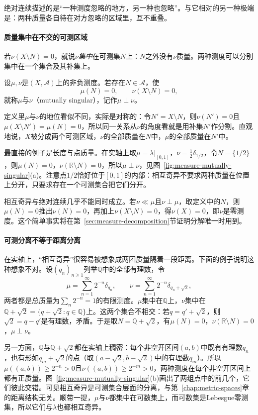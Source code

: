 绝对连续描述的是“一种测度忽略的地方，另一种也忽略”。与它相对的另一种极端是：两种质量各自待在对方忽略的区域里，互不重叠。

\paragraph{质量集中在不交的可测区域}
若$\nu(X\setminus N)=0$，就说$\nu$\emph{集中}在可测集$N$上：$N$之外没有$\nu$质量。两种测度可以分别集中在一个集合及其补集上。

\begin{definition}[相互奇异]
\label{def:measure-singular}
设$\mu,\nu$是$(X,\mathcal A)$上的非负测度。若存在$N\in\mathcal A$，使
\[
 \mu(N)=0,\qquad \nu(X\setminus N)=0,
\]
就称$\mu$与$\nu$（mutually singular），记作$\mu\perp\nu$。
\end{definition}

定义里$\mu$与$\nu$的地位看似不同，实际是对称的：令$N'=X\setminus N$，则$\nu(N')=0$且$\mu(X\setminus N')=\mu(N)=0$，所以同一关系从$\nu$的角度看就是用补集$N'$作分割。直观地说，$X$被分成两个可测区域，$\nu$的全部质量在$N$中，$\mu$的全部质量在$N'$中。

最直接的例子是长度与点质量。在实轴上取$\mu=\lambda|_{[0,1]}$，$\nu=\tfrac12\delta_{1/2}$，令$N=\{1/2\}$，则$\mu(N)=0$，$\nu(\mathbb R\setminus N)=0$，所以$\mu\perp\nu$，见图~\ref{fig:measure-mutually-singular}(a)。注意点$1/2$恰好位于$[0,1]$的内部：相互奇异不要求两种质量在位置上分开，只要求存在一个可测集合把它们分开。

相互奇异与绝对连续几乎不能同时成立。若$\nu\ll\mu$且$\nu\perp\mu$，取定义中的$N$，则$\mu(N)=0$推出$\nu(N)=0$，再加上$\nu(X\setminus N)=0$，得$\nu(X)=0$，即$\nu$是零测度。这个简单事实将在第~\ref{sec:measure-decomposition}节证明分解唯一时用到。

\paragraph{可测分离不等于距离分离}
在实轴上，“相互奇异”很容易被想象成两团质量隔着一段距离。下面的例子说明这种想象不对。设$(q_n)_{n\ge1}$列举$\mathbb Q$中的全部有理数，令
\[
 \mu=\sum_{n=1}^\infty2^{-n}\delta_{q_n},\qquad
 \nu=\sum_{n=1}^\infty2^{-n}\delta_{q_n+\sqrt2},
\]
两者都是总质量为$\sum_n2^{-n}=1$的有限测度。$\mu$集中在$\mathbb Q$上，$\nu$集中在$\mathbb Q+\sqrt2=\{q+\sqrt2:q\in\mathbb Q\}$上。这两个集合不相交：若$q=q'+\sqrt2$，则$\sqrt2=q-q'$是有理数，矛盾。于是取$N=\mathbb Q+\sqrt2$，有$\mu(N)=0$，$\nu(\mathbb R\setminus N)=0$，$\mu\perp\nu$。

另一方面，$\mathbb Q$与$\mathbb Q+\sqrt2$都在实轴上稠密：每个非空开区间$(a,b)$中既有有理数$q_n$，也有形如$q_m+\sqrt2$的点（取$(a-\sqrt2,b-\sqrt2)$中的有理数$q_m$）。所以$\mu((a,b))\ge2^{-n}>0$且$\nu((a,b))\ge2^{-m}>0$，两种测度在每个非空开区间上都有正质量。图~\ref{fig:measure-mutually-singular}(b)画出了两组点中的前几个，它们彼此交错。可见相互奇异是可测集合层面的分离，与第~\ref{chap:metric-spaces}章的距离结构无关。顺带一提，$\mu$与$\nu$都集中在可数集上，而可数集是Lebesgue零测集，所以它们与$\lambda$也都相互奇异。

